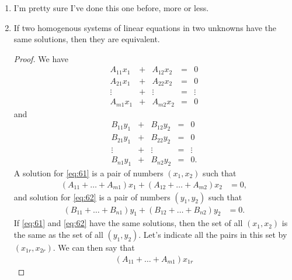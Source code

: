 \documentclass[12pt]{article}
\begin{document}
\begin{enumerate}
  \item
    I'm pretty sure I've done this one before, more or less.

  \item
    \begin{thm}
      If two homogenous systems of linear equations in two
      unknowns have the same solutions, then they are equivalent.
      \begin{proof}
        We have
        \begin{equation} \label{eq:61}
        \begin{array}{cccccccccc}
          A_{11}x_1 & + & A_{12}x_2 & = & 0\\
          A_{21}x_1 & + & A_{22}x_2 & = & 0\\
          \vdots    & + & \vdots    & = & \vdots\\
          A_{m1}x_1 & + & A_{m2}x_2 & = & 0
        \end{array}
        \end{equation}
        and
        \begin{equation} \label{eq:62}
        \begin{array}{cccccccccc}
          B_{11}y_1 & + & B_{12}y_2 & = & 0\\
          B_{21}y_1 & + & B_{22}y_2 & = & 0\\
          \vdots    & + & \vdots    & = & \vdots\\
          B_{n1}y_1 & + & B_{n2}y_2 & = & 0.
        \end{array}
        \end{equation}
        A solution for \eqref{eq:61} is a pair of numbers
        $(x_1,x_2)$ such that
        \begin{align*}
        (A_{11} + \ldots + A_{m1})x_1
          + (A_{12} + \ldots + A_{m2})x_2
          &= 0,
        \end{align*}
        and solution for \eqref{eq:62} is a pair of numbers
        $(y_1,y_2)$ such that
        \begin{align*}
        (B_{11} + \ldots + B_{n1})y_1
          + (B_{12} + \ldots + B_{n2})y_2
          &= 0.
        \end{align*}
        If \eqref{eq:61} and \eqref{eq:62} have the same
        solutions, then the set of all $(x_1,x_2)$ is the same as
        the set of all $(y_1,y_2)$. Let's indicate all the pairs
        in this set by $(x_{1r},x_{2r})$. We can then say that
        \begin{align*}
          (A_{11} + \ldots + A_{m1})x_{1r}

\end{align*}
\end{proof}
\end{thm}
\end{enumerate}
\end{document}
